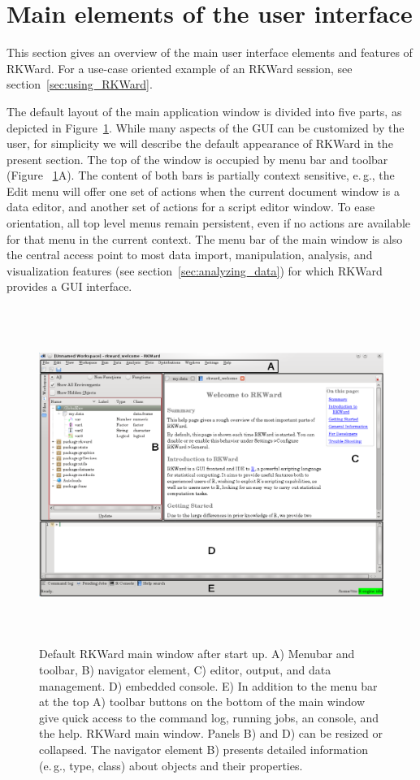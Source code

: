 \section{Main elements of the user interface}
\label{sec:user_interface}
This section gives an overview of the main user interface elements and features of RKWard.
For a use-case oriented example of an RKWard session, see section~\ref{sec:using_RKWard}.

The default layout of the main application window is divided into five
parts, as depicted in Figure~\ref{fig:main_window}. While many aspects
of the GUI can be customized by the user, for simplicity we will
describe the default appearance of RKWard in the present section. The
top of the window is occupied by menu bar and toolbar (Figure~
\ref{fig:main_window}A). The content of both bars is partially context
sensitive, e.\,g., the Edit menu will offer
one set of actions when the current document window is a data editor,
and another set of actions for a  script
editor window. To ease orientation, all top level menus remain
persistent, even if no actions are available for that menu in the
current context. The menu bar of the main window is also the central
access point to most data import, manipulation, analysis, and
visualization features (see section~\ref{sec:analyzing_data}) for which RKWard provides a GUI
interface.

\begin{figure}[htp]
 \centering
 \includegraphics[width=15.446cm,height=10.949cm]{../figures/main_window.png}
 \caption{Default RKWard main window after start up. 
A) Menubar and toolbar, B) navigator element, C) editor, output, 
and data management. D) embedded  console. 
E) In addition to the menu bar at the top A) toolbar buttons 
on the bottom of the main window give quick access to the command log, 
running jobs, an  console, and the  help. 
RKWard main window. Panels B) and D) can be resized or collapsed. The navigator element B)
presents detailed information (e.\,g., type, class) about objects and their properties.}
 \label{fig:main_window}
\end{figure}

